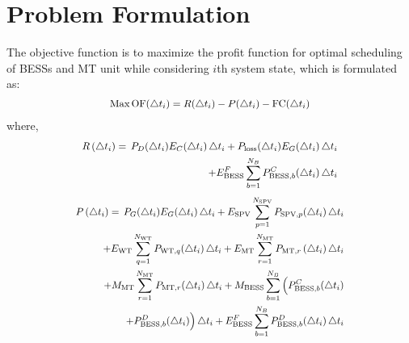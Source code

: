 \documentclass[journal]{IEEEtran}
\newcommand*\Laplace{\mathop{}\!\mathbin\bigtriangleup}
\begin{document}
\section{Problem Formulation}\label{section:problem formulation}
The objective function is to maximize the profit function for optimal scheduling of BESSs and MT unit while considering $i$th system state, which is formulated as:
    \begin{equation}
        \scalebox{0.9}[0.9]{$
    \begin{split}
    \text{Max}\,\text{OF}(\Laplace {{t}_{i}})=R(\Laplace {{t}_{i}})-P(\Laplace {{t}_{i}})-\text{FC}(\Laplace {{t}_{i}})
    \end{split}
    $}
    \label{eqn5}
    \end{equation} 
    where,
    \begin{equation}
    \scalebox{0.9}[0.9]{$
    \begin{split}
 R\left( \Laplace {{t}_{i}} \right)=\,{{P}_{D}}(\Laplace {{t}_{i}}){{E}_{C}}(\Laplace {{t}_{i}})\Laplace {{t}_{i}}+{{P}_{\text{loss}}}(\Laplace {{t}_{i}}){{E}_{G}}(\Laplace {{t}_{i}})\Laplace {{t}_{i}}\\ +E_{\text{BESS}}^{F}\sum\limits_{b=1}^{{{N}_{B}}}{P_{\text{BESS},b}^{C}(\Laplace {{t}_{i}})\Laplace {{t}_{i}}}
    \end{split}
    $}
    \label{eqn6}
    \end{equation}
    \begin{equation}
    \scalebox{0.88}[0.89]{$
    \begin{split}
 P\left( \Laplace {{t}_{i}} \right)=\,{{P}_{G}}(\Laplace {{t}_{i}}){{E}_{G}}(\Laplace {{t}_{i}})\Laplace {{t}_{i}}+  {{E}_{\text{SPV}}} \sum\limits_{p=1}^{{{N}_{\text{SPV}}}}{{{P}_{\text{SPV},p}}(\Laplace {{t}_{i}})\Laplace {{t}_{i}}}\\ 
 + {{E}_{\text{WT}}}\sum\limits_{q=1}^{{{N}_{\text{WT}}}}{{{P}_{\text{WT},q}}(\Laplace {{t}_{i}})\Laplace {{t}_{i}}}+   {{E}_{\text{MT}}}\sum\limits_{r=1}^{{{N}_{\text{MT}}}}{{{P}_{\text{MT},r}}\left( \Laplace {{t}_{i}} \right)\Laplace {{t}_{i}}}\\
  +  {{M}_{\text{MT}}}\sum\limits_{r=1}^{{{N}_{\text{MT}}}}  {{{P}_{\text{MT},r}}(\Laplace {{t}_{i}})\Laplace {{t}_{i}}}+  {{M}_{\text{BESS}}} \sum\limits_{b=1}^{{{N}_{B}}}\Big(P_{\text{BESS},b}^{C}(\Laplace {{t}_{i}}) \\+  P_{\text{BESS},b}^{D}(\Laplace {{t}_{i}}) \Big) \Laplace {{t}_{i}}+  E_{\text{BESS}}^{F}\sum\limits_{b=1}^{{{N}_{B}}}{P_{\text{BESS},b}^{D}(\Laplace {{t}_{i}})\Laplace {{t}_{i}}} \\ 
     \end{split}
     $}
    \label{eqn7}
    \end{equation}
\end{document}
